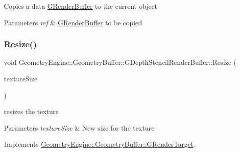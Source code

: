 Copies a data \mbox{\hyperlink{class_geometry_engine_1_1_geometry_buffer_1_1_g_render_buffer}{G\+Render\+Buffer}} to the current object 
\begin{DoxyParams}{Parameters}
{\em ref} & \mbox{\hyperlink{class_geometry_engine_1_1_geometry_buffer_1_1_g_render_buffer}{G\+Render\+Buffer}} to be copied \\
\hline
\end{DoxyParams}
\mbox{\label{class_geometry_engine_1_1_geometry_buffer_1_1_g_depth_stencil_render_buffer_aee7b6a5ecc14a2aac4c6f363fa609720}} 
\subsubsection{\texorpdfstring{Resize()}{Resize()}}
{\footnotesize\ttfamily void Geometry\+Engine\+::\+Geometry\+Buffer\+::\+G\+Depth\+Stencil\+Render\+Buffer\+::\+Resize (\begin{DoxyParamCaption}\item[{const Q\+Vector2D \&}]{texture\+Size }\end{DoxyParamCaption})\hspace{0.3cm}{\ttfamily [virtual]}}

resizes the texture 
\begin{DoxyParams}{Parameters}
{\em texture\+Size} & New size for the texture \\
\hline
\end{DoxyParams}


Implements \mbox{\hyperlink{class_geometry_engine_1_1_geometry_buffer_1_1_g_render_target_ac1e54f456408b53de44fe10116d649dd}{Geometry\+Engine\+::\+Geometry\+Buffer\+::\+G\+Render\+Target}}.

\mbox{\label{class_geometry_engine_1_1_geometry_buffer_1_1_g_depth_stencil_render_buffer_af2877932c33e892f310de1c07ad69a20}} 
